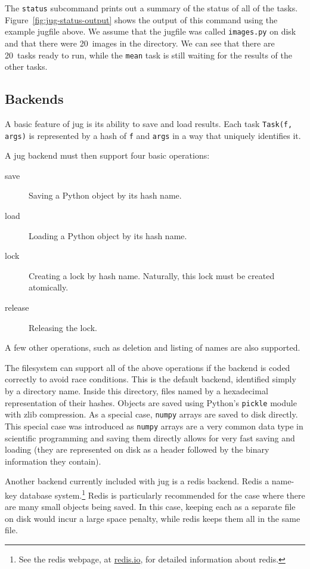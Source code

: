 \documentclass{article}
\let\code\texttt
\begin{document}
The \texttt{status} subcommand prints out a summary of the status of all of the
tasks. Figure~\ref{fig:jug-status-output} shows the output of this command
using the example jugfile above. We assume that the jugfile was called
\code{images.py} on disk and that there were 20~images in the directory. We can
see that there are 20~tasks ready to run, while the \code{mean} task is still
waiting for the results of the other tasks.

\subsection{Backends}

A basic feature of jug is its ability to save and load results. Each task
\code{Task(f, args)} is represented by a hash of \code{f} and \code{args} in a
way that uniquely identifies it.

A jug backend must then support four basic operations:

\begin{description}
\item[save] Saving a Python object by its hash name.
\item[load] Loading a Python object by its hash name.
\item[lock] Creating a lock by hash name. Naturally, this lock must be created
atomically.
\item[release] Releasing the lock.
\end{description}

A few other operations, such as deletion and listing of names are also
supported.

The filesystem can support all of the above operations if the backend is coded
correctly to avoid race conditions. This is the default backend, identified
simply by a directory name. Inside this directory, files named by a hexadecimal
representation of their hashes. Objects are saved using Python's \code{pickle}
module with zlib compression. As a special case, \code{numpy} arrays
\citep{walt2011the} are saved to disk directly. This special case was
introduced as \code{numpy} arrays are a very common data type in scientific
programming and saving them directly allows for very fast saving and loading
(they are represented on disk as a header followed by the binary information
they contain).

Another backend currently included with jug is a redis backend. Redis a
name-key database system.\footnote{See the redis webpage, at
\href{http://redis.io}{redis.io}, for detailed information about redis.} Redis
is particularly recommended for the case where there are many small objects
being saved. In this case, keeping each as a separate file on disk would incur
a large space penalty, while redis keeps them all in the same file.
\end{document}
